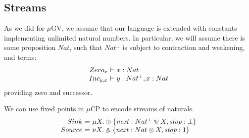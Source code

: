 \documentclass[orivec,envcountsame]{llncs}
\makeatletter
\newcommand{\with}{\mathbin\binampersand}
\newcommand{\parr}{\mathbin\bindnasrepma}
\newcommand{\cpdual}[1]{#1^\perp}
\newcommand{\cptyp}[2]{#1 \vdash #2}
\newcommand{\clabel}[1]{\mathit{#1}}
\newcommand{\mucp}{$\mu\mathrm{CP}$\xspace}
\newcommand{\mugv}{$\mu\mathrm{GV}$\xspace}
\newcommand{\ba}{\begin{array}}
\newcommand{\ea}{\end{array}}
\newenvironment{equations}{\[\ba{@{}r@{~}c@{~}l@{}}}{\ea\]}
\newenvironment{eqs}{\ba{@{}r@{~}c@{~}l@{}}}{\ea}
\makeatother
\begin{document}





\subsection{Streams}

As we did for \mugv, we assume that our language is extended with constants implementing unlimited
natural numbers. In particular, we will assume there is some proposition $Nat$, such that
$\cpdual{Nat}$ is subject to contraction and weakening, and terms:
%
\small\[
\begin{eqs}
Zero_x &\vdash& x:Nat \\
Inc_{y,x} &\vdash& y:\cpdual{Nat},x:Nat \\
\end{eqs}
\]\normalsize
providing zero and successor.

We can use fixed points in \mucp to encode streams of naturals.
%
\small\begin{equations}
  Sink &=& \mu X. \oplus \{ \clabel{next}: \cpdual{Nat} \parr X, \clabel{stop}: \bot \} \\
  Source &=& \nu X. \with \{ \clabel{next}: Nat \otimes X, \clabel{stop}: 1 \} \\
\end{equations}\normalsize%

\end{document}
